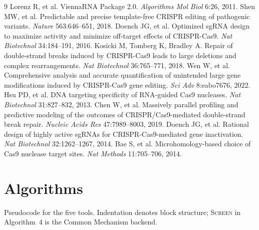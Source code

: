 \documentclass[12pt]{article}
\begin{document}
\begin{thebibliography}{9}
 Lorenz R, et al. ViennaRNA Package 2.0. \emph{Algorithms Mol Biol} 6:26, 2011.
 Shen MW, et al. Predictable and precise template-free CRISPR editing of pathogenic variants. \emph{Nature} 563:646--651, 2018.
 Doench JG, et al. Optimized sgRNA design to maximize activity and minimize off-target effects of CRISPR-Cas9. \emph{Nat Biotechnol} 34:184--191, 2016.
 Kosicki M, Tomberg K, Bradley A. Repair of double-strand breaks induced by CRISPR-Cas9 leads to large deletions and complex rearrangements. \emph{Nat Biotechnol} 36:765--771, 2018.
 Wen W, et al. Comprehensive analysis and accurate quantification of unintended large gene modifications induced by CRISPR-Cas9 gene editing. \emph{Sci Adv} 8:eabo7676, 2022.
 Hsu PD, et al. DNA targeting specificity of RNA-guided Cas9 nucleases. \emph{Nat Biotechnol} 31:827--832, 2013.
 Chen W, et al. Massively parallel profiling and predictive modeling of the outcomes of CRISPR/Cas9-mediated double-strand break repair. \emph{Nucleic Acids Res} 47:7989--8003, 2019.
 Doench JG, et al. Rational design of highly active sgRNAs for CRISPR-Cas9-mediated gene inactivation. \emph{Nat Biotechnol} 32:1262--1267, 2014.
 Bae S, et al. Microhomology-based choice of Cas9 nuclease target sites. \emph{Nat Methods} 11:705--706, 2014.
\end{thebibliography}


\section{Algorithms}
Pseudocode for the five tools. Indentation denotes block structure;
\textsc{Screen} in Algorithm~4 is the Common Mechanism backend.
\end{document}
